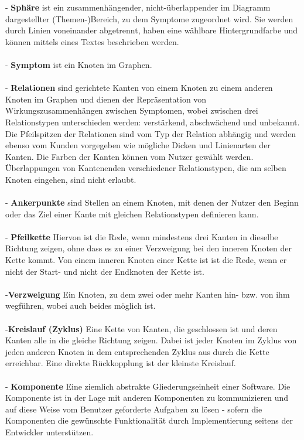 \documentclass[enabledeprecatedfontcommands,fontsize=11pt,paper=a4,twoside]{scrartcl}
\newcounter{one}
\begin{document}
	- \textbf{\hypertarget{Sphaere}{Sphäre}} ist ein zusammenhängender, nicht-überlappender im Diagramm dargestellter (Themen-)Bereich, zu dem Symptome zugeordnet wird. Sie werden durch Linien voneinander abgetrennt, haben eine wählbare Hintergrundfarbe und können mittels eines Textes beschrieben werden. \\ \\
	- \textbf{\hypertarget{Symptom}{Symptom}} ist ein Knoten im Graphen.  \\ \\
	- \textbf{Relationen} sind gerichtete Kanten von einem Knoten zu einem anderen Knoten im Graphen und dienen der Repräsentation von Wirkungszusammenhängen zwischen Symptomen, wobei zwischen drei Relationstypen unterschieden werden: verstärkend, abschwächend und unbekannt. Die Pfeilspitzen der Relationen sind vom Typ der Relation abhängig und werden ebenso vom Kunden vorgegeben wie mögliche Dicken und Linienarten der Kanten. Die Farben der Kanten können vom Nutzer gewählt werden. Überlappungen von Kantenenden verschiedener Relationstypen, die am selben Knoten eingehen, sind nicht erlaubt. \\ \\
	- \textbf{Ankerpunkte}  sind Stellen an einem Knoten, mit denen der Nutzer den Beginn oder das Ziel einer Kante mit gleichen Relationstypen definieren kann. \\ \\
	- \textbf{Pfeilkette} Hiervon ist die Rede, wenn mindestens drei Kanten in dieselbe Richtung zeigen, ohne dass es zu einer Verzweigung bei den inneren Knoten der Kette kommt. Von einem inneren Knoten einer Kette ist ist die Rede, wenn er nicht der Start- und nicht der Endknoten der Kette ist. \\ \\
	-\textbf{Verzweigung} Ein Knoten, zu dem zwei oder mehr Kanten hin- bzw. von ihm wegführen, wobei auch beides möglich ist. \\ \\
	-\textbf{\hypertarget{Kreislauf}{Kreislauf (Zyklus)}} Eine Kette von Kanten, die geschlossen ist und deren Kanten alle in die gleiche Richtung zeigen. Dabei ist jeder Knoten im Zyklus von jeden anderen Knoten in dem entsprechenden Zyklus aus durch die Kette erreichbar. Eine direkte Rückkopplung ist der kleinste Kreislauf. \\ \\
	- \textbf{Komponente} Eine ziemlich abstrakte Gliederungseinheit einer Software. Die Komponente ist in der Lage mit anderen Komponenten zu kommunizieren und auf diese Weise vom Benutzer geforderte Aufgaben zu lösen - sofern die Komponenten die gewünschte Funktionalität durch Implementierung seitens der Entwickler unterstützen. \\ \\
\end{document}
